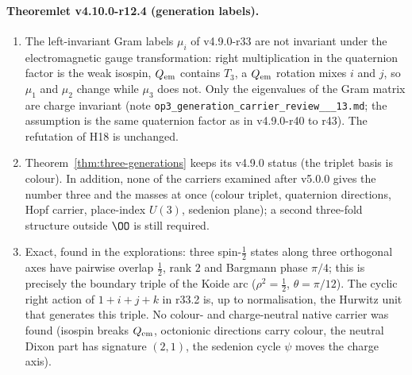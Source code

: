 \paragraph{Theoremlet v4.10.0-r12.4 (generation labels).}
\begin{enumerate}[leftmargin=2em]
\item[(a)] The left-invariant Gram labels \(\mu_i\) of v4.9.0-r33 are not invariant under the electromagnetic gauge
transformation: right multiplication in the quaternion factor is the weak isospin, \(Q_{\rm em}\) contains \(T_3\), a
\(Q_{\rm em}\) rotation mixes \(i\) and \(j\), so \(\mu_1\) and \(\mu_2\) change while \(\mu_3\) does not.  Only the eigenvalues of
the Gram matrix are charge invariant (note \texttt{op3\_\allowbreak generation\_\allowbreak carrier\_\allowbreak review\_\_\_\allowbreak 13.md};
the assumption is the same quaternion factor as in v4.9.0-r40 to r43).  The refutation of H18 is unchanged.
\item[(b)] Theorem~\ref{thm:three-generations} keeps its v4.9.0 status (the triplet basis is colour).  In addition, none of the
carriers examined after v5.0.0 gives the number three and the masses at once (colour triplet, quaternion directions, Hopf
carrier, place-index \(U(3)\), sedenion plane); a second three-fold structure outside \(\OO\) is still required.
\item[(c)] Exact, found in the explorations: three spin-\(\tfrac12\) states along three orthogonal axes have pairwise overlap
\(\tfrac12\), rank \(2\) and Bargmann phase \(\pi/4\); this is precisely the boundary triple of the Koide arc
(\(\rho^2=\tfrac12\), \(\theta=\pi/12\)).  The cyclic right action of \(1+i+j+k\) in r33.2 is, up to normalisation, the
Hurwitz unit that generates this triple.  No colour- and charge-neutral native carrier was found (isospin breaks
\(Q_{\rm em}\), octonionic directions carry colour, the neutral Dixon part has signature \((2,1)\), the sedenion cycle \(\psi\)
moves the charge axis).
\end{enumerate}

